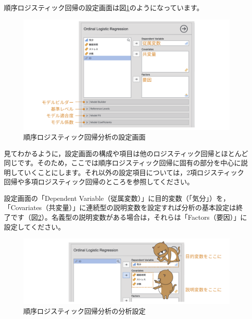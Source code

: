 \documentclass[
  12pt,
  a5jpaper,
  lualatex, ja=standard]{bxjsbook}
\begin{document}
順序ロジスティック回帰の設定画面は図\ref{fig:regression-ordinal-setting}のようになっています。

\begin{figure}[!ht]

{\centering \includegraphics[width=1\linewidth]{images/regression/ordinal-setting} 

}

\caption{順序ロジスティック回帰分析の設定画面}\label{fig:regression-ordinal-setting}
\end{figure}

見てわかるように，設定画面の構成や項目は他のロジスティック回帰とほとんど同じです。そのため，ここでは順序ロジスティック回帰に固有の部分を中心に説明していくことにします。それ以外の設定項目については，2項ロジスティック回帰や多項ロジスティック回帰のところを参照してください。

設定画面の「Dependent Variable（従属変数）」に目的変数（「気分」）を，「Covariates（共変量）」に連続型の説明変数を設定すれば分析の基本設定は終了です（図\ref{fig:regression-ordinal-set-vars}）。名義型の説明変数がある場合は，それらは「Factors（要因）」に設定してください。

\begin{figure}[!ht]

{\centering \includegraphics[width=1\linewidth]{images/regression/ordinal-set-vars} 

}

\caption{順序ロジスティック回帰分析の分析設定}\label{fig:regression-ordinal-set-vars}
\end{figure}
\end{document}
